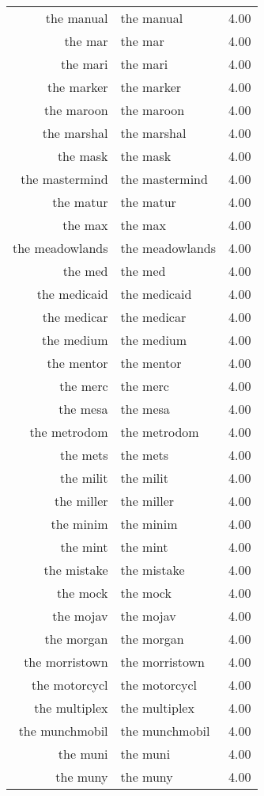 \begin{table}[ht]
\begin{tabular}{rlr}
  the manual & the manual & 4.00 \\ 
  the mar & the mar & 4.00 \\ 
  the mari & the mari & 4.00 \\ 
  the marker & the marker & 4.00 \\ 
  the maroon & the maroon & 4.00 \\ 
  the marshal & the marshal & 4.00 \\ 
  the mask & the mask & 4.00 \\ 
  the mastermind & the mastermind & 4.00 \\ 
  the matur & the matur & 4.00 \\ 
  the max & the max & 4.00 \\ 
  the meadowlands & the meadowlands & 4.00 \\ 
  the med & the med & 4.00 \\ 
  the medicaid & the medicaid & 4.00 \\ 
  the medicar & the medicar & 4.00 \\ 
  the medium & the medium & 4.00 \\ 
  the mentor & the mentor & 4.00 \\ 
  the merc & the merc & 4.00 \\ 
  the mesa & the mesa & 4.00 \\ 
  the metrodom & the metrodom & 4.00 \\ 
  the mets & the mets & 4.00 \\ 
  the milit & the milit & 4.00 \\ 
  the miller & the miller & 4.00 \\ 
  the minim & the minim & 4.00 \\ 
  the mint & the mint & 4.00 \\ 
  the mistake & the mistake & 4.00 \\ 
  the mock & the mock & 4.00 \\ 
  the mojav & the mojav & 4.00 \\ 
  the morgan & the morgan & 4.00 \\ 
  the morristown & the morristown & 4.00 \\ 
  the motorcycl & the motorcycl & 4.00 \\ 
  the multiplex & the multiplex & 4.00 \\ 
  the munchmobil & the munchmobil & 4.00 \\ 
  the muni & the muni & 4.00 \\ 
  the muny & the muny & 4.00 \\ 

\end{tabular}
\end{table}
